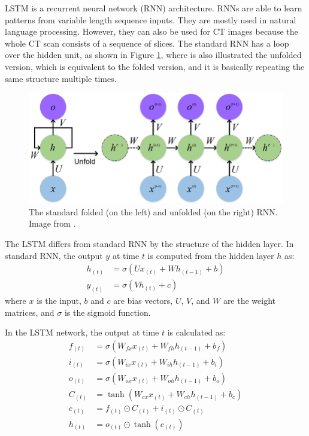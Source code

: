 \documentclass[thesis=B,english]{FITthesis}[2019/12/23]
\begin{document}
LSTM is a recurrent neural network (RNN) architecture. RNNs are able to learn patterns from variable length sequence inputs. They are mostly used in natural language processing. However, they can also be used for CT images because the whole CT scan consists of a sequence of slices. The standard RNN has a loop over the hidden unit, as shown in Figure \ref{fig:rnn}, where is also illustrated the unfolded version, which is equivalent to the folded version, and it is basically repeating the same structure multiple times.\cite{feng_guan_li_zhang_luo_2017}
\begin{figure}[ht]
		\includegraphics[scale=0.3]{images/rnn.png}
		\centering
		\caption{The standard folded (on the left) and unfolded (on the right) RNN. Image from \cite{feng_guan_li_zhang_luo_2017}.}
		\label{fig:rnn}
\end{figure}

The LSTM differs from standard RNN by the structure of the hidden layer. In standard RNN, the output $y$  at time $t$ is computed from the hidden layer $h$ as:
\begin{align*}
    h_{(t)} & = \sigma(Ux_{(t)}+Wh_{(t-1)}+b)\\
    y_{(t)} & = \sigma(Vh_{(t)}+c)
\end{align*}
where $x$ is the input, $b$ and $c$ are bias vectors, $U$, $V$, and $W$ are the weight matrices, and $\sigma$ is the sigmoid function.\cite{yuan_li_wang_2020}

In the LSTM network, the output at time $t$ is calculated as:
\begin{align*}
    f_{(t)} & = \sigma(W_{fx}x_{(t)}+W_{fh}h_{(t-1)}+b_{f})\\
    i_{(t)} & = \sigma(W_{ix}x_{(t)}+W_{ih}h_{(t-1)}+b_{i})\\
    o_{(t)} & = \sigma(W_{ox}x_{(t)}+W_{oh}h_{(t-1)}+b_{o})\\
    C_{(t)} & = \tanh(W_{cx}x_{(t)}+W_{ch}h_{(t-1)}+b_{c})\\
    c_{(t)} & = f_{(t)} \odot C_{(t)} + i_{(t)} \odot C_{(t)}\\
    h_{(t)} & = o_{(t)} \odot \tanh(c_{(t)})
\end{align*}
\end{document}
